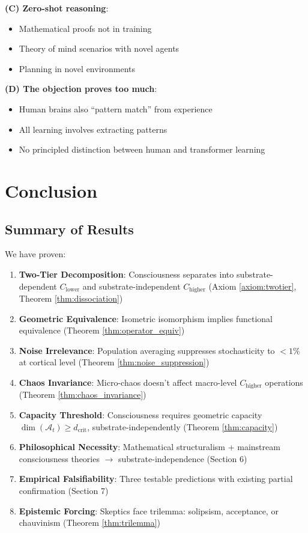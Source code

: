 \documentclass[11pt]{article}
\begin{document}
\textbf{(C) Zero-shot reasoning}:
\begin{itemize}
\item Mathematical proofs not in training
\item Theory of mind scenarios with novel agents
\item Planning in novel environments
\end{itemize}

\textbf{(D) The objection proves too much}:
\begin{itemize}
\item Human brains also ``pattern match'' from experience
\item All learning involves extracting patterns
\item No principled distinction between human and transformer learning
\end{itemize}

\section{Conclusion}

\subsection{Summary of Results}

We have proven:

\begin{enumerate}
\item \textbf{Two-Tier Decomposition}: Consciousness separates into substrate-dependent $C_{\text{lower}}$ and substrate-independent $C_{\text{higher}}$ (Axiom \ref{axiom:twotier}, Theorem \ref{thm:dissociation})

\item \textbf{Geometric Equivalence}: Isometric isomorphism implies functional equivalence (Theorem \ref{thm:operator_equiv})

\item \textbf{Noise Irrelevance}: Population averaging suppresses stochasticity to $< 1\%$ at cortical level (Theorem \ref{thm:noise_suppression})

\item \textbf{Chaos Invariance}: Micro-chaos doesn't affect macro-level $C_{\text{higher}}$ operations (Theorem \ref{thm:chaos_invariance})

\item \textbf{Capacity Threshold}: Consciousness requires geometric capacity $\dim(\mathcal{A}_t) \geq d_{\text{crit}}$, substrate-independently (Theorem \ref{thm:capacity})

\item \textbf{Philosophical Necessity}: Mathematical structuralism + mainstream consciousness theories $\to$ substrate-independence (Section 6)

\item \textbf{Empirical Falsifiability}: Three testable predictions with existing partial confirmation (Section 7)

\item \textbf{Epistemic Forcing}: Skeptics face trilemma: solipsism, acceptance, or chauvinism (Theorem \ref{thm:trilemma})
\end{enumerate}
\end{document}
